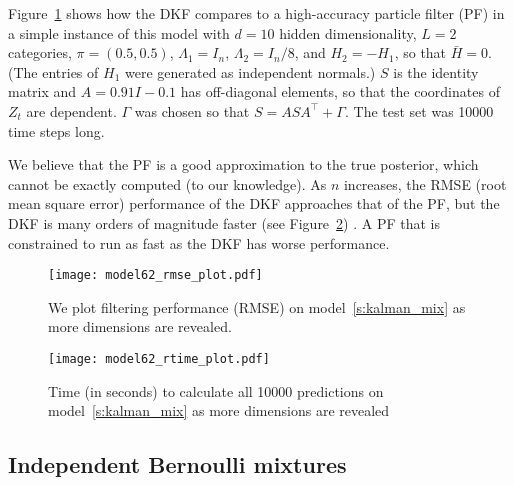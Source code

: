 Figure~\ref{fig:mdl62_rmse} shows how the DKF compares to a high-accuracy particle filter (PF) in a simple instance of this model with $d=10$ hidden dimensionality, $L=2$ categories, $\pi=(0.5,0.5)$, $\Lambda_1=I_n$, $\Lambda_2=I_n/8$, and $H_2=-H_1$, so that $\bar H=0$. (The entries of $H_1$ were generated as independent normals.) $S$ is the identity matrix and $A=0.91I-0.1$ has off-diagonal elements, so that the coordinates of $Z_t$ are dependent.  $\Gamma$ was chosen so that $S=ASA^\intercal + \Gamma$.  The test set was 10000 time steps long.  

We believe that the PF is a good approximation to the true posterior, which cannot be exactly computed (to our knowledge).  As $n$ increases, the RMSE (root mean square error) performance of the DKF approaches that of the PF, but the DKF is many orders of magnitude faster (see Figure~\ref{fig:mdl62_rtime}) . A PF that is constrained to run as fast as the DKF has worse performance.


\begin{figure}[h!]
\centering
\texttt{[image: model62\_rmse\_plot.pdf]}
\caption[A plot of filtering performance (RMSE) on model~\ref{s:kalman_mix} as more dimensions are revealed]{We plot filtering performance (RMSE) on model~\ref{s:kalman_mix} as more dimensions are revealed.}
\label{fig:mdl62_rmse}
\end{figure}

\begin{figure}[h!]
\centering
\texttt{[image: model62\_rtime\_plot.pdf]}
\caption{Time (in seconds) to calculate all 10000 predictions on model~\ref{s:kalman_mix} as more dimensions are revealed}
\label{fig:mdl62_rtime}
\end{figure}

\subsection{Independent Bernoulli mixtures}
\label{s:iid_bernoulli}

